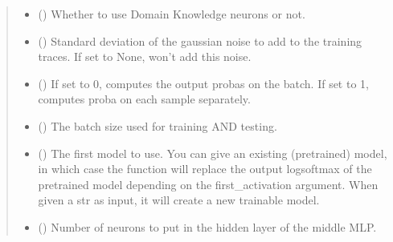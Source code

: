 \documentclass[letterpaper,10pt,english]{sphinxmanual}
\begin{document}
\begin{fulllineitems}
\begin{quote}
\begin{description}
\begin{itemize}
\item {} 
\sphinxAtStartPar
{} (\sphinxstyleliteralemphasis{\sphinxupquote{, }}) \textendash{} Whether to use Domain Knowledge neurons or not.

\item {} 
\sphinxAtStartPar
{} (\sphinxstyleliteralemphasis{\sphinxupquote{, }}) \textendash{} Standard deviation of the gaussian noise to add to the training traces. If set
to None, won’t add this noise.

\item {} 
\sphinxAtStartPar
{} (\sphinxstyleliteralemphasis{\sphinxupquote{, }}) \textendash{} If set to 0, computes the output probas on the batch. If set to 1, computes proba on
each sample separately.

\item {} 
\sphinxAtStartPar
{} (\sphinxstyleliteralemphasis{\sphinxupquote{, }}) \textendash{} The batch size used for training AND testing.

\item {} 
\sphinxAtStartPar
{} (\sphinxstyleliteralemphasis{\sphinxupquote{ | }}\sphinxstyleliteralemphasis{\sphinxupquote{, }}) \textendash{} The first model to use. You can give an existing (pre\sphinxhyphen{}trained) model, in which case
the function will replace the output logsoftmax of the pretrained model depending
on the first\_activation argument. When given a str as input, it will create a new
trainable model.

\item {} 
\sphinxAtStartPar
{} (\sphinxstyleliteralemphasis{\sphinxupquote{, }}) \textendash{} Number of neurons to put in the hidden layer of the middle MLP.


\end{itemize}
\end{description}
\end{quote}
\end{fulllineitems}
\end{document}

